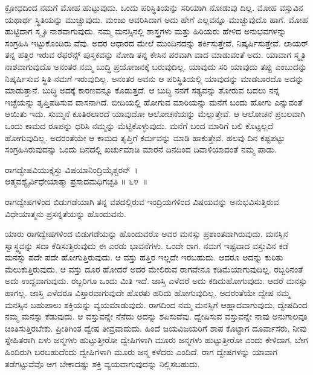 ಕ್ರೋಧದಿಂದ ನಮಗೆ ಮೋಹ ಹುಟ್ಟುವುದು. ಒಂದು ಪರಿಸ್ಥಿತಿಯನ್ನು ಸರಿಯಾಗಿ ನೋಡುವು ದಿಲ್ಲ. ಮೋಹ ವಸ್ತುವಿನ ಯಥಾರ್ಥ ಸ್ಥಿತಿಯನ್ನು ಮುಚ್ಚುವುದು. ಮಂಜು ಆವರಿಸಿದಾಗ ಅದು ಹೇಗೆ ಎಲ್ಲವನ್ನೂ ಮುಚ್ಚುವುದೊ ಹಾಗೆ. ಮೋಹ ಹುಟ್ಟಿದಾಗ ಸ್ಮೃತಿ ನಾಶವಾಗುವುದು. ನಮ್ಮ ಮನಸ್ಸಿನಲ್ಲಿ ಶಾಸ್ತ್ರಗಳು ಮತ್ತು ಹಿರಿಯರು ಹೇಳಿದ ಅನುಭವಗಳನ್ನು ಸಂಗ್ರಹಿಸಿ ಇಟ್ಟುಕೊಂಡಿರು ವೆವು. ಅದರ ಆಧಾರದ ಮೇಲೆ ಮುಂದಿನದನ್ನು ತರ್ಕಿಸುತ್ತೇವೆ, ನಿಷ್ಕರ್ಷಿಸುತ್ತೇವೆ. ಲಾಯರ್ ತನ್ನ ಹತ್ತಿರ ಇರುವ ರೆಫರೆನ್ಸ್ ಪುಸ್ತಕವನ್ನು ನೋಡಿ ತನ್ನ ಕೇಸಿನ ಪರವಾಗಿ ವಾದ ಮಾಡುವಂತೆ ಅದು. ಯಾವಾಗ ಸ್ಮೃತಿ ನಾಶವಾಗುವುದೊ ಅನಂತರ ನಮ್ಮ ಬುದ್ಧಿ ಪ್ರಯೋಜನಕ್ಕೆ ಬರುವುದಿಲ್ಲ. ಯಾವುದು ಸರಿ ಯಾವುದು ತಪ್ಪು ಎಂಬುದನ್ನು ನಿಷ್ಕರ್ಷಿಸುವ ಸ್ಥಿತಿ ನಮಗೆ ಇರುವುದಿಲ್ಲ. ಅನಂತರ ಅವನು ಆ ಪರಿಸ್ಥಿತಿಯಲ್ಲಿ ಯಾವುದನ್ನು ಮಾಡಬಾರದೊ ಅದನ್ನು ಮಾಡುತ್ತಾನೆ. ಬುದ್ಧಿ ಅದಕ್ಕೆ ಕಾರಣವನ್ನೂ ಕೊಡುತ್ತದೆ. ಆ ಬುದ್ಧಿ ನನಗೆ ಸತ್ಯವನ್ನು ತೋರುವ ಬದಲು ನನ್ನ ಇಚ್ಛೆಯನ್ನು ತೃಪ್ತಿಪಡಿಸುವ ದಾಸನಾಗಿದೆ. ಬೀದಿಯಲ್ಲಿ ಹೋಗುವ ಮಾರಿಯನ್ನು ಮನೆಗೆ ಬಂದು ಹೋಗು ಎನ್ನುವಂತೆ ಆಯಿತು ಇದು. ಸುಮ್ಮನೆ ಕೂತಿರಲಾರದೆ ಯಾವುದೋ ಆಲೋಚನೆಯನ್ನು ಮೆಲ್ಲುತ್ತೇವೆ. ಆ ಆಲೋಚನೆ ಪ್ರಬಲವಾಗಿ ಒಂದು ಕಾಮದ ರೂಪನ್ನು ಧರಿಸಿ ನಮ್ಮನ್ನು ಮೆಟ್ಟಿಕೊಳ್ಳುವುದು. ಮನೆಗೆ ಬಂದ ಮಾರಿಗೆ ಬಲಿ ಕೊಟ್ಟಲ್ಲದೆ ಹೋಗುವುದಿಲ್ಲ. ಅದರಂತೆಯೇ ಆ ಕಾಮದ ತೃಪ್ತಿಗೆ ಕರ್ಮವನ್ನು ಮಾಡಿ ಹಾಕುತ್ತೇವೆ. ಹಲವು ದಿನ ಕಷ್ಟಪಟ್ಟು ಸಂಗ್ರಹಿಸಿರುವುದನ್ನು ಒಂದು ದಿನದಲ್ಲಿ ಖರ್ಚುಮಾಡಿ ಮಾರನೆ ದಿನದಿಂದ ದಿವಾಳಿಯಾದಂತೆ ನಮ್ಮ ಪಾಡು.

\begin{shloka}
ರಾಗದ್ವೇಷವಿಯುಕ್ತೈಸ್ತು ವಿಷಯಾನಿಂದ್ರಿಯೈಶ್ಚರನ್~।\\ಆತ್ಮವಶ್ಯೈರ್ವಿಧೇಯಾತ್ಮಾ ಪ್ರಸಾದಮಧಿಗಚ್ಛತಿ \hfill॥ ೬೪~॥
\end{shloka}

\begin{artha}
ರಾಗದ್ವೇಷಗಳಿಂದ ಬಿಡುಗಡೆಯಾಗಿ ತನ್ನ ವಶದಲ್ಲಿರುವ ಇಂದ್ರಿಯಗಳಿಂದ ವಿಷಯವನ್ನು ಅನುಭವಿಸುತ್ತಿರುವ ವಿಧೇಯಾತ್ಮನು ಪ್ರಸನ್ನತೆಯನ್ನು ಹೊಂದುವನು.
\end{artha}

ಯಾರು ರಾಗದ್ವೇಷಗಳಿಂದ ಬಿಡುಗಡೆಯನ್ನು ಹೊಂದುವರೊ ಅವರ ಮನಸ್ಸು ಪ್ರಶಾಂತವಾಗಿರುವುದು. ಮನಸ್ಸಿನ ಸ್ವಾಸ್ಥ್ಯವನ್ನು ಸದಾ ಕೆಡಿಸುತ್ತಿರುವುದು ಈ ಎರಡು ಭಾವನೆಗಳು. ಒಂದೇ ರಾಗ. ನಮಗೆ ಇಷ್ಟವಾದ ವಸ್ತುವಿನ ಕಡೆ ಮನಸ್ಸು ಪದೇ ಪದೇ ಹೋಗುತ್ತಿರುವುದು. ಆ ವಸ್ತು ಹತ್ತಿರ ಇಲ್ಲದೇ ಇರಬಹುದು. ಆದರೂ ಅದನ್ನು ಕುರಿತು ಮೆಲುಕುತ್ತಿರುವುದು. ಆ ವಸ್ತು ದೂರ ಹೋದರೆ ಅದರ ಮೇಲಿರುವ ರಾಗವೇನೂ ಕಡಿಮೆಯಾಗುವುದಿಲ್ಲ. ರಬ್ಬರಿನಂತೆ ಅದು ಉದ್ದವಾಗುವುದು. ರಬ್ಬರಿಗೂ ಒಂದು ಮಿತಿ ಇದೆ. ಜಾಸ್ತಿ ಎಳೆದರೆ ಅದು ಕಡಿದುಹೋಗುವುದು. ಆದರೆ ಮನಸ್ಸು ಹಾಗಲ್ಲ. ಜಾಸ್ತಿ ಎಳೆದರೂ ವಿಸ್ತಾರವಾಗುವುದೇ ಹೊರತು ಹರಿದು ಹೋಗುವುದಿಲ್ಲ. ಅದರಂತೆಯೇ ದ್ವೇಷ ನಮ್ಮ ಮನಸ್ಸಿನ ಬಹುಪಾಲು ಶಕ್ತಿಯನ್ನು ವ್ಯಯಮಾಡುವುದು. ರಾಗದಿಂದ ನಮ್ಮ ಮನಸ್ಸಿಗೆ ಆಹ್ಲಾದವಾಗುವುದು, ದ್ವೇಷದಿಂದ ನಮ್ಮ ಮನಸ್ಸು ಕೆಡುವುದು. ಆ ವಸ್ತುವನ್ನೇ ನೆನೆದು ಅದನ್ನು ಶಪಿಸುವೆವು. ದ್ವೇಷಿಸುವ ವಸ್ತುವನ್ನೇ ನಾವು ಅನುಗಾಲವೂ ಚಿಂತಿಸುತ್ತಿರಬೇಕು. ಪ್ರೀತಿಗಿಂತ ದ್ವೇಷ ತೀವ್ರವಾದುದು. ಹಿಂದೆ ಜಯವಿಜಯರಿಗೆ ಶಾಪ ಕೊಟ್ಟಾಗ ದೂರ್ವಾಸರು, ನೀವು ಸ್ನೇಹಿತರಾಗಿ ಏಳು ಜನ್ಮಗಳು ಹುಟ್ಟುತ್ತೀರೋ ದ್ವೇಷಿಗಳಾಗಿ ಮೂರು ಜನ್ಮಗಳು ಹುಟ್ಟುತ್ತೀರೋ ಎಂದು ಕೇಳಿದಾಗ, ಬೇಗ ಹಿಂದಿರುಗಿ ಬರಬಹುದೆಂದು ದ್ವೇಷಿಗಳಾಗಿ ಮೂರು ಜನ್ಮ ಕಳೆದರು ಎಂದಿದೆ. ರಾಗ ದ್ವೇಷಗಳನ್ನು ಯಾವಾಗ ತಡೆಗಟ್ಟುವೆವೊ ಆಗ ಬೇಕಾದಷ್ಟು ಶಕ್ತಿ ವ್ಯಯವಾಗುವುದನ್ನು ನಿಲ್ಲಿಸಬಹುದು.

